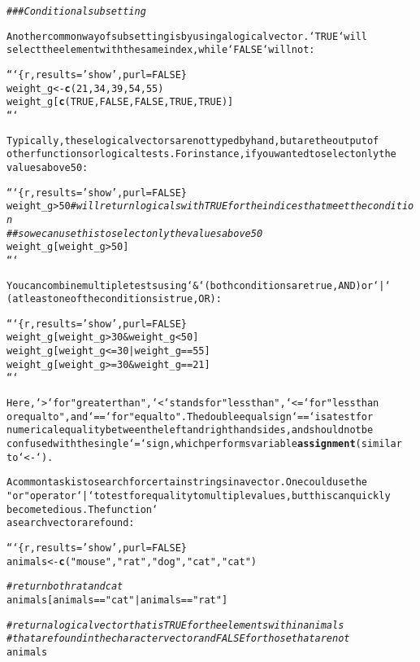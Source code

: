 \documentclass{article}\usepackage[]{graphicx}\usepackage[]{xcolor}
\makeatletter
\newcommand{\hlstr}[1]{\textcolor[rgb]{0.192,0.494,0.8}{#1}}%
\newcommand{\hlcom}[1]{\textcolor[rgb]{0.678,0.584,0.686}{\textit{#1}}}%
\newcommand{\hlkwd}[1]{\textcolor[rgb]{0.737,0.353,0.396}{\textbf{#1}}}%
\newenvironment{kframe}{%
 \def\at@end@of@kframe{}%
 \ifinner\ifhmode%
  \def\at@end@of@kframe{\end{minipage}}%
  \begin{minipage}{\columnwidth}%
 \fi\fi%
 \def\FrameCommand##1{\hskip\@totalleftmargin \hskip-\fboxsep
 \colorbox{shadecolor}{##1}\hskip-\fboxsep
     \hskip-\linewidth \hskip-\@totalleftmargin \hskip\columnwidth}%
 \MakeFramed {\advance\hsize-\width
   \@totalleftmargin\z@ \linewidth\hsize
   \@setminipage}}%
 {\par\unskip\endMakeFramed%
 \at@end@of@kframe}
\newenvironment{knitrout}{}{} %
\makeatother
\begin{document}
\begin{knitrout}
\begin{kframe}
\begin{alltt}
\hlcom{### Conditional subsetting}

Another common way of subsetting is by using a logical vector. `TRUE` will
select the element with the same index, while `FALSE` will not:

```\{r, results = \hlstr{'show'}, purl = FALSE\}
weight_g <- \hlkwd{c}(21, 34, 39, 54, 55)
weight_g[\hlkwd{c}(TRUE, FALSE, FALSE, TRUE, TRUE)]
```

Typically, these logical vectors are not typed by hand, but are the output of
other functions or logical tests. For instance, if you wanted to select only the
values above 50:

```\{r, results = \hlstr{'show'}, purl = FALSE\}
weight_g > 50    \hlcom{# will return logicals with TRUE for the indices that meet the condition}
\hlcom{## so we can use this to select only the values above 50}
weight_g[weight_g > 50]
```

You can combine multiple tests using `&` (both conditions are true, AND) or `|`
(at least one of the conditions is true, OR):

```\{r, results = \hlstr{'show'}, purl = FALSE\}
weight_g[weight_g > 30 & weight_g < 50]
weight_g[weight_g <= 30 | weight_g == 55]
weight_g[weight_g >= 30 & weight_g == 21]
```

Here, `>` for \hlstr{"greater than"}, `<` stands for \hlstr{"less than"}, `<=` for "less than
or equal to\hlstr{", and `==` for "}equal to". The double equal sign `==` is a test for
numerical equality between the left and right hand sides, and should not be
confused with the single `=` sign, which performs variable \hlkwd{assignment} (similar
to `<-`).

A common task is to search for certain strings in a vector.  One could use the
\hlstr{"or"} operator `|` to test for equality to multiple values, but this can quickly
become tedious. The function `%in%` allows you to test if any of the elements of
a search vector are found:

```\{r, results = \hlstr{'show'}, purl = FALSE\}
animals <- \hlkwd{c}(\hlstr{"mouse"}, \hlstr{"rat"}, \hlstr{"dog"}, \hlstr{"cat"}, \hlstr{"cat"})

\hlcom{# return both rat and cat}
animals[animals == \hlstr{"cat"} | animals == \hlstr{"rat"}]

\hlcom{# return a logical vector that is TRUE for the elements within animals}
\hlcom{# that are found in the character vector and FALSE for those that are not}
animals %in% \hlkwd{c}(\hlstr{"rat"}, \hlstr{"cat"}, \hlstr{"dog"}, \hlstr{"duck"}, \hlstr{"goat"}, \hlstr{"bird"}, \hlstr{"fish"})


\end{alltt}
\end{kframe}
\end{knitrout}
\end{document}

